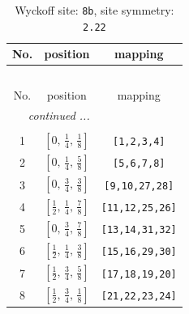 \documentclass[fleqn,8pt]{jsarticle}
\begin{document}
\begin{longtable}{ccc}
\caption{Wyckoff site: {\tt 8b}, site symmetry: {\tt 2.22}}
 \\
 \hline \hline
No. & position & mapping \\ \hline \endfirsthead

\multicolumn{2}{l}{\tablename\ \thetable{}} \\
 \hline \hline
No. & position & mapping \\ \hline \endhead

 \hline \hline
\multicolumn{2}{r}{\footnotesize\it continued ...} \\ \endfoot

 \hline \hline
\multicolumn{2}{r}{} \\ \endlastfoot

1 & $\left[ 0,\, \frac{1}{4},\, \frac{1}{8} \right]$ & {\tt [1,2,3,4]} \\ \hline
2 & $\left[ 0,\, \frac{1}{4},\, \frac{5}{8} \right]$ & {\tt [5,6,7,8]} \\ \hline
3 & $\left[ 0,\, \frac{3}{4},\, \frac{3}{8} \right]$ & {\tt [9,10,27,28]} \\ \hline
4 & $\left[ \frac{1}{2},\, \frac{1}{4},\, \frac{7}{8} \right]$ & {\tt [11,12,25,26]} \\ \hline
5 & $\left[ 0,\, \frac{3}{4},\, \frac{7}{8} \right]$ & {\tt [13,14,31,32]} \\ \hline
6 & $\left[ \frac{1}{2},\, \frac{1}{4},\, \frac{3}{8} \right]$ & {\tt [15,16,29,30]} \\ \hline
7 & $\left[ \frac{1}{2},\, \frac{3}{4},\, \frac{5}{8} \right]$ & {\tt [17,18,19,20]} \\ \hline
8 & $\left[ \frac{1}{2},\, \frac{3}{4},\, \frac{1}{8} \right]$ & {\tt [21,22,23,24]} \\
\end{longtable}
\renewcommand{\arraystretch}{1.2}
\end{document}
